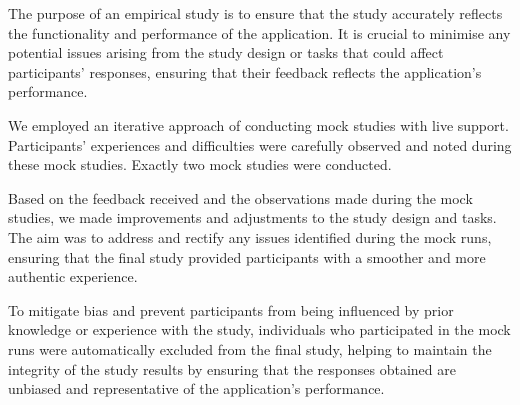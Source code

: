 The purpose of an empirical study is to ensure that the study accurately
reflects the functionality and performance of the application. It is crucial to
minimise any potential issues arising from the study design or tasks that could
affect participants' responses, ensuring that their feedback reflects the
application's performance.

We employed an iterative approach of conducting mock studies with live support.
Participants' experiences and difficulties were carefully observed and noted
during these mock studies. Exactly two mock studies were conducted.

Based on the feedback received and the observations made during the mock
studies, we made improvements and adjustments to the study design and tasks.
The aim was to address and rectify any issues identified during the mock runs,
ensuring that the final study provided participants with a smoother and more
authentic experience.

To mitigate bias and prevent participants from being influenced by prior
knowledge or experience with the study, individuals who participated in the
mock runs were automatically excluded from the final study, helping to maintain
the integrity of the study results by ensuring that the responses obtained are
unbiased and representative of the application's performance.
